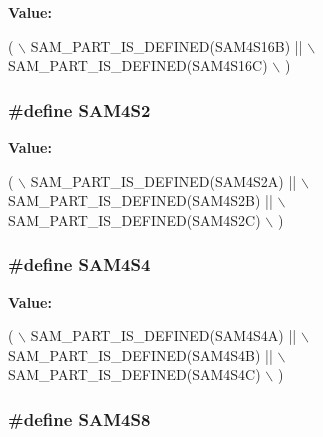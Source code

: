 {\bfseries Value\-:}
\begin{DoxyCode}
( \(\backslash\)
                SAM\_PART\_IS\_DEFINED(SAM4S16B) || \(\backslash\)
                SAM\_PART\_IS\_DEFINED(SAM4S16C) \(\backslash\)
                )
\end{DoxyCode}
\hypertarget{group__sam__part__macros__group_ga797a42a5eb0d374075a5cbf6b6b5318b}{
\subsubsection[{S\-A\-M4\-S2}]{\setlength{\rightskip}{0pt plus 5cm}\#define S\-A\-M4\-S2}}\label{group__sam__part__macros__group_ga797a42a5eb0d374075a5cbf6b6b5318b}
{\bfseries Value\-:}
\begin{DoxyCode}
( \(\backslash\)
                SAM\_PART\_IS\_DEFINED(SAM4S2A) || \(\backslash\)
                SAM\_PART\_IS\_DEFINED(SAM4S2B) || \(\backslash\)
                SAM\_PART\_IS\_DEFINED(SAM4S2C) \(\backslash\)
                )
\end{DoxyCode}
\hypertarget{group__sam__part__macros__group_ga9c0feae652dc37c207bd933f6db2d7f4}{
\subsubsection[{S\-A\-M4\-S4}]{\setlength{\rightskip}{0pt plus 5cm}\#define S\-A\-M4\-S4}}\label{group__sam__part__macros__group_ga9c0feae652dc37c207bd933f6db2d7f4}
{\bfseries Value\-:}
\begin{DoxyCode}
( \(\backslash\)
                SAM\_PART\_IS\_DEFINED(SAM4S4A) || \(\backslash\)
                SAM\_PART\_IS\_DEFINED(SAM4S4B) || \(\backslash\)
                SAM\_PART\_IS\_DEFINED(SAM4S4C) \(\backslash\)
                )
\end{DoxyCode}
\hypertarget{group__sam__part__macros__group_ga04e32c037894a537ffb6193413693cb0}{
\subsubsection[{S\-A\-M4\-S8}]{\setlength{\rightskip}{0pt plus 5cm}\#define S\-A\-M4\-S8}}\label{group__sam__part__macros__group_ga04e32c037894a537ffb6193413693cb0}
